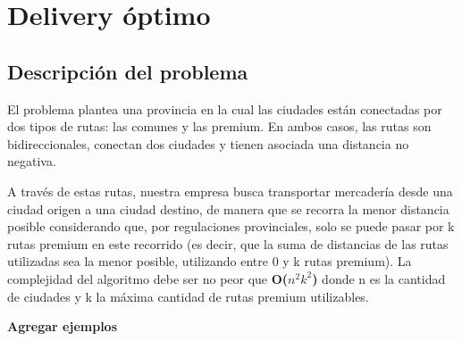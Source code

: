 \section{Delivery óptimo}

\subsection{Descripción del problema}
El problema plantea una provincia en la cual las ciudades están conectadas por dos tipos de rutas: las comunes y las premium. En ambos casos, las rutas son bidireccionales, conectan dos ciudades y tienen asociada una distancia no negativa.
\\
\par
A través de estas rutas, nuestra empresa busca transportar mercadería desde una ciudad origen a una ciudad destino, de manera que se recorra la menor distancia posible considerando que, por regulaciones provinciales, solo se puede pasar por k rutas premium en este recorrido (es decir, que la suma de distancias de las rutas utilizadas sea la menor posible, utilizando entre 0 y k rutas premium). La complejidad del algoritmo debe ser no peor que \textbf{O($n^2k^2$)} donde n es la cantidad de ciudades y k la máxima cantidad de rutas premium utilizables.
\\
\par
\textbf{Agregar ejemplos}
\\
\par
